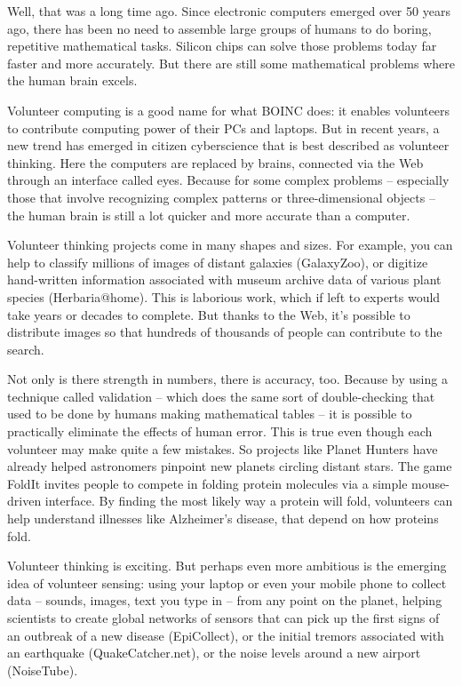 Well, that was a long time ago. Since electronic computers emerged over 50 years ago, there has been no need to assemble large groups of humans to do boring, repetitive mathematical tasks. Silicon chips can solve those problems today far faster and more accurately. But there are still some mathematical problems where the human brain excels.\par

Volunteer computing is a good name for what BOINC does: it enables volunteers to contribute computing power of their PCs and laptops. But in recent years, a new trend has emerged in citizen cyberscience that is best described as volunteer thinking. Here the computers are replaced by brains, connected via the Web through an interface called eyes. Because for some complex problems – especially those that involve recognizing complex patterns or three-dimensional objects – the human brain is still a lot quicker and more accurate than a computer.\par

Volunteer thinking projects come in many shapes and sizes. For example, you can help to classify millions of images of distant galaxies (GalaxyZoo), or digitize hand-written information associated with museum archive data of various plant species (Herbaria@home).  This is laborious work, which if left to experts would take years or decades to complete. But thanks to the Web, it’s possible to distribute images so that hundreds of thousands of people can contribute to the search. \par

Not only is there strength in numbers, there is accuracy, too. Because by using a technique called validation – which does the same sort of double-checking that used to be done by humans making mathematical tables – it is possible to practically eliminate the effects of human error. This is true even though each volunteer may make quite a few mistakes. So projects like Planet Hunters have already helped astronomers pinpoint new planets circling distant stars. The game FoldIt invites people to compete in folding protein molecules via a simple mouse-driven interface. By finding the most likely way a protein will fold, volunteers can help understand illnesses like Alzheimer’s disease, that depend on how proteins fold. \par

Volunteer thinking is exciting. But perhaps even more ambitious is the emerging idea of volunteer sensing: using  your laptop or even your mobile phone to collect data – sounds, images, text you type in – from any point on the planet, helping scientists to create global networks of sensors that can pick up the first signs of an outbreak of a new disease (EpiCollect), or the initial tremors associated with an earthquake (QuakeCatcher.net), or the noise levels around a new airport (NoiseTube).\par

